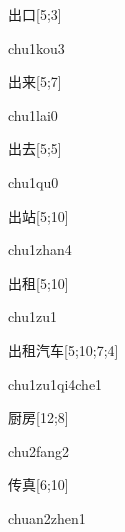 \begin{verbete}{出口}[5;3]
\begin{pronuncia}{chu1kou3}
\end{pronuncia}
\end{verbete}

\begin{verbete}[chu1qu0]{出来}[5;7]
\begin{pronuncia}{chu1lai0}
\end{pronuncia}
\end{verbete}

\begin{verbete}[chu1qu0]{出去}[5;5]
\begin{pronuncia}{chu1qu0}
\end{pronuncia}
\end{verbete}

\begin{verbete}{出站}[5;10]
\begin{pronuncia}{chu1zhan4}
\end{pronuncia}
\end{verbete}

\begin{verbete}[chu1zu1]{出租}[5;10]
\begin{pronuncia}{chu1zu1}
\end{pronuncia}
\end{verbete}

\begin{verbete}{出租汽车}[5;10;7;4]
\begin{pronuncia}[\\]{chu1zu1qi4che1}
\end{pronuncia}
\end{verbete}

\begin{verbete}{厨房}[12;8]
\begin{pronuncia}{chu2fang2}
\end{pronuncia}
\end{verbete}

\begin{verbete}{传真}[6;10]
\begin{pronuncia}{chuan2zhen1}
\end{pronuncia}
\end{verbete}

